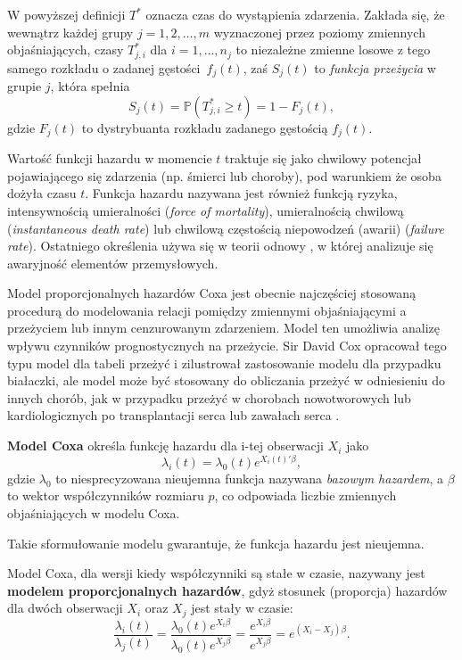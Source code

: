 W powyższej definicji $T^*$ oznacza czas do wystąpienia zdarzenia. Zakłada się, że wewnątrz każdej grupy $j=1,2,\dots, m$ wyznaczonej przez poziomy zmiennych objaśniających, czasy $T_{j,i}^*$ dla $i=1,\dots,n_j$ to niezależne zmienne losowe z tego samego rozkładu o zadanej gęstości~$f_j(t)$, zaś $S_j(t)$ to \textit{funkcja przeżycia} w grupie $j$, która spełnia 
\begin{equation}
S_j(t) = \mathbb{P}(T^*_{j,i} \geq t )  = 1 - F_j(t), 
\end{equation}
gdzie $F_j(t)$ to dystrybuanta rozkładu zadanego gęstością $f_j(t)$.

Wartość funkcji hazardu w momencie $t$ traktuje się jako chwilowy potencjał pojawiającego się zdarzenia (np. śmierci lub choroby), pod warunkiem że osoba dożyła czasu $t$. Funkcja hazardu nazywana jest również funkcją ryzyka,
intensywnością umieralności (\textit{force of mortality}), umieralnością
chwilową (\textit{instantaneous death rate}) lub chwilową
częstością niepowodzeń (awarii) (\textit{failure rate}). Ostatniego
określenia używa się w teorii odnowy \cite{cox0}, w której analizuje
się awaryjność elementów przemysłowych. 


Model proporcjonalnych hazardów Coxa \cite{cox} jest obecnie najczęściej stosowaną procedurą do modelowania relacji pomiędzy zmiennymi objaśniającymi a przeżyciem lub innym cenzurowanym zdarzeniem. Model ten umożliwia analizę wpływu czynników prognostycznych na przeżycie. Sir David Cox opracował tego typu model dla tabeli przeżyć i zilustrował zastosowanie modelu dla przypadku
białaczki, ale model może być stosowany do obliczania
przeżyć w odniesieniu do innych chorób, jak
w przypadku przeżyć w chorobach nowotworowych lub
kardiologicznych po transplantacji serca lub zawałach
serca \cite{norwe}. 

\begin{definition}
\textbf{Model Coxa} określa funkcję hazardu dla i-tej obserwacji $X_i$ jako
\begin{equation}
\lambda_i(t) = \lambda_0(t)e^{X_i(t)'\beta},
\end{equation}
gdzie $\lambda_0$ to niesprecyzowana nieujemna funkcja nazywana \textit{bazowym hazardem}, a $\beta$ to wektor współczynników rozmiaru $p$, co odpowiada liczbie zmiennych objaśniających w modelu Coxa.
\end{definition}

Takie sformułowanie modelu gwarantuje, że funkcja hazardu jest nieujemna. 


Model Coxa, dla wersji kiedy współczynniki są stałe w czasie, nazywany jest \textbf{modelem proporcjonalnych hazardów}, gdyż stosunek (proporcja) hazardów dla dwóch obserwacji $X_i$ oraz $X_j$ jest stały w czasie:  
$$\dfrac{\lambda_i(t)}{\lambda_j(t)} = \dfrac{\lambda_0(t)e^{X_i\beta}}{\lambda_0(t)e^{X_j\beta}} = \dfrac{e^{X_i\beta}}{e^{X_j\beta}} = e^{(X_i-X_j)\beta}.$$

